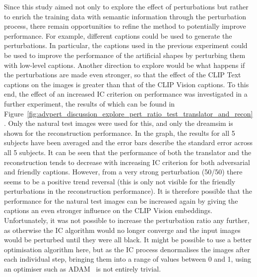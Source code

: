 Since this study aimed not only to explore the effect of perturbations but rather to enrich the training data with semantic information through the perturbation process, there remain opportunities to refine the method to potentially improve performance. For example, different captions could be used to generate the perturbations. In particular, the captions used in the previous experiment could be used to improve the performance of the artificial shapes by perturbing them with low-level captions. Another direction to explore would be what happens if the perturbations are made even stronger, so that the effect of the CLIP Text captions on the images is greater than that of the CLIP Vision captions. To this end, the effect of an increased IC criterion on performance was investigated in a further experiment, the results of which can be found in Figure~\ref{fig:advpert_discussion_explore_pert_ratio_test_translator_and_recon}. Only the natural test images were used for this, and only the dreamsim is shown for the reconstruction performance. In the graph, the results for all 5 subjects have been averaged and the error bars describe the standard error across all 5 subjects. It can be seen that the performance of both the translator and the reconstruction tends to decrease with increasing IC criterion for both adversarial and friendly captions. However, from a very strong perturbation (50/50) there seems to be a positive trend reversal (this is only not visible for the friendly perturbations in the reconstruction performance). It is therefore possible that the performance for the natural test images can be increased again by giving the captions an even stronger influence on the CLIP Vision embeddings. Unfortunately, it was not possible to increase the perturbation ratio any further, as otherwise the IC algorithm would no longer converge and the input images would be perturbed until they were all black. It might be possible to use a better optimisation algorithm here, but as the IC process denormalises the images after each individual step, bringing them into a range of values between 0 and 1, using an optimiser such as ADAM~\cite{kingmaAdamMethodStochastic2017} is not entirely trivial.

